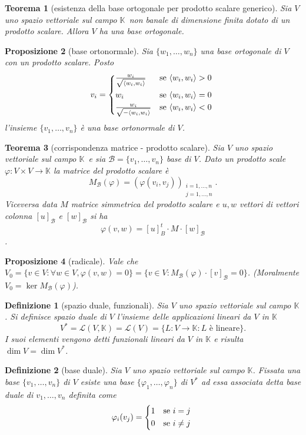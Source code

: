 \documentclass[9pt, a4paper]{article}
\newcommand{\K}{\mathbb{K}}
\newcommand{\letvs}{Sia $ V $ uno spazio vettoriale sul campo $ \K $}
\newcommand{\scprd}[2]{\langle #1, #2 \rangle}
\theoremstyle{mythm}
\newtheorem{definition}{Definizione}[section]
\newtheorem{thm}{Teorema}[section]
\newtheorem{prop}[thm]{Proposizione}
\begin{document}
\begin{thm}[esistenza della base ortogonale per prodotto scalare generico]
	\letvs \ non banale di dimensione finita dotato di un prodotto scalare. Allora $ V $ ha una base ortogonale. 
\end{thm}

\begin{prop}[base ortonormale]
	Sia $ \{w_1, \ldots, w_n\} $ una base ortogonale di $ V $ con un prodotto scalare. Posto
	\[v_i = 
	\begin{cases*}
	\frac{w_i}{\sqrt{\scprd{w_i}{w_i}}} & se $ \scprd{w_i}{w_i} > 0 $ \\
	w_i & se $ \scprd{w_i}{w_i} = 0 $ \\
	\frac{w_i}{\sqrt{-\scprd{w_i}{w_i}}} & se $ \scprd{w_i}{w_i} < 0 $ \\
	\end{cases*}\]
	l'insieme $ \{v_1, \ldots, v_n\} $ è una base ortonormale di $ V $. 
\end{prop}

\begin{thm}[corrispondenza matrice - prodotto scalare]
	\letvs \ e sia $ \mathscr{B} = \{v_1, \ldots, v_n\} $ base di $ V $. Dato un prodotto scale $ \varphi \colon V \times V \to \K $ la matrice del prodotto scalare è \[M_{\mathscr{B}}(\varphi) = (\varphi(v_i, v_j))_{\substack{i = 1, \ldots, n \\ j = 1, \ldots, n}}.\] Viceversa data $ M $ matrice simmetrica del prodotto scalare e $ u, w $ vettori di vettori colonna $ [u]_{\mathscr{B}} $ e $ [w]_{\mathscr{B}} $ si ha \[\varphi(v, w) = [u]_{B}^t \cdot M \cdot [w]_{\mathscr{B}}\].
\end{thm}

\begin{prop}[radicale]
	Vale che $ V_0 = \{v \in V : \forall w \in V, \varphi(v, w) = 0\} = \{v \in V : M_{\mathscr{B}}(\varphi) \cdot [v]_{\mathscr{B}} = 0\} $. (Moralmente $ V_0 = \ker{M_{\mathscr{B}}(\varphi)} $). 
\end{prop}

\begin{definition}[spazio duale, funzionali]
	\letvs. Si definisce spazio duale di $ V $ l'insieme delle applicazioni lineari da $ V $ in $ \K $ \[V^{*} = \mathscr{L}(V, \K) = \mathscr{L}(V) = \{L \colon V \to \K : L \text{ è lineare}\}.\] I suoi elementi vengono detti funzionali lineari da $ V $ in $ \K $ e risulta $ \dim V = \dim V^{*} $. 
\end{definition}

\begin{definition}[base duale]
	\letvs. Fissata una base $ \{v_1, \ldots, v_n\} $ di $ V $ esiste una base $ \{\varphi_1, \ldots, \varphi_n\} $ di $ V^{*} $ ad essa associata detta base duale di $ v_1, \ldots, v_n $ definita come 
	\[\varphi_i (v_j) = 
	\begin{cases*}
	1 & se $ i = j $ \\
	0 & se $ i \neq j $ \\
	\end{cases*}\]
\end{definition}
\end{document}
